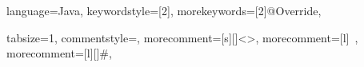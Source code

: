  {
    language=Java,
    keywordstyle=[2]{\color{gray!70!black}},
    morekeywords=[2]{@Override},
}

 {
    tabsize=1,
    commentstyle=\color{blue}, 
    morecomment=[s][\color{cEclipsePurple}]{<}{>},
		morecomment=[l]{\	},
    morecomment=[l][\color{cEclipseGreen}]{\#},		
}